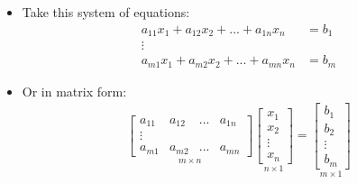 \begin{itemize}
    \item Take this system of equations:
    \begin{align*}
        a_{11}x_1 + a_{12}x_2 + ... + a_{1n}x_n & = b_1 \\
        \vdots & \\
        a_{m1}x_1 + a_{m2}x_2 + ... + a_{mn}x_n & = b_m 
    \end{align*}

    \item Or in matrix form:
    \begin{align*}
        \underset{m \times n}{
            \begin{bmatrix}
                a_{11} & a_{12} & ... & a_{1n} \\
                \vdots & \\
                a_{m1} & a_{m2} & ... & a_{mn}
            \end{bmatrix}
        }
        \underset{n \times 1}{
            \begin{bmatrix}
                x_1 \\
                x_2 \\
                \vdots \\
                x_n
            \end{bmatrix}
        }
        =
        \underset{m \times 1}{
            \begin{bmatrix}
                b_1 \\
                b_2 \\
                \vdots \\
                b_m
            \end{bmatrix}
        }
    \end{align*}


\end{itemize}
